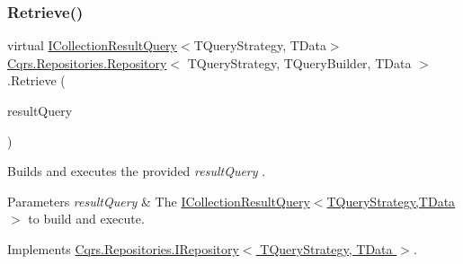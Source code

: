 \mbox{\label{classCqrs_1_1Repositories_1_1Repository_ab1136a454f981848d49e0d0a2f4b6a2f_ab1136a454f981848d49e0d0a2f4b6a2f}} 
\subsubsection{\texorpdfstring{Retrieve()}{Retrieve()}\hspace{0.1cm}{\footnotesize\ttfamily [2/2]}}
{\footnotesize\ttfamily virtual \hyperlink{interfaceCqrs_1_1Repositories_1_1Queries_1_1ICollectionResultQuery}{I\+Collection\+Result\+Query}$<$T\+Query\+Strategy, T\+Data$>$ \hyperlink{classCqrs_1_1Repositories_1_1Repository}{Cqrs.\+Repositories.\+Repository}$<$ T\+Query\+Strategy, T\+Query\+Builder, T\+Data $>$.Retrieve (\begin{DoxyParamCaption}\item[{\hyperlink{interfaceCqrs_1_1Repositories_1_1Queries_1_1ICollectionResultQuery}{I\+Collection\+Result\+Query}$<$ T\+Query\+Strategy, T\+Data $>$}]{result\+Query }\end{DoxyParamCaption})\hspace{0.3cm}{\ttfamily [virtual]}}



Builds and executes the provided {\itshape result\+Query} . 


\begin{DoxyParams}{Parameters}
{\em result\+Query} & The \hyperlink{interfaceCqrs_1_1Repositories_1_1Queries_1_1ICollectionResultQuery}{I\+Collection\+Result\+Query$<$\+T\+Query\+Strategy,\+T\+Data$>$} to build and execute.\\
\hline
\end{DoxyParams}


Implements \hyperlink{interfaceCqrs_1_1Repositories_1_1IRepository_a0faeb50aa395d63ccd81e66906360e81_a0faeb50aa395d63ccd81e66906360e81}{Cqrs.\+Repositories.\+I\+Repository$<$ T\+Query\+Strategy, T\+Data $>$}.

\mbox{\label{classCqrs_1_1Repositories_1_1Repository_a893276506e64034992d2c29d5ef11100_a893276506e64034992d2c29d5ef11100}} 
